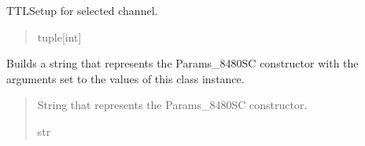 \documentclass[letterpaper,10pt,english]{sphinxmanual}
\begin{document}
\begin{fulllineitems}
\begin{fulllineitems}
\begin{quote}
\begin{description}
\end{description}\end{quote}

\end{fulllineitems}


\begin{fulllineitems}
\label{\detokenize{Morelia.Parameters:Morelia.Parameters.Params8480SC.Params8480SC.ttlSetup}}
\pysigstartsignatures
{}
\pysigstopsignatures
\sphinxAtStartPar
TTL\sphinxhyphen{}Setup for selected channel.
\begin{quote}\begin{description}
\sphinxAtStartPar
tuple{[}int{]}

\end{description}\end{quote}

\end{fulllineitems}


\begin{fulllineitems}
\label{\detokenize{Morelia.Parameters:Morelia.Parameters.Params8480SC.Params8480SC.GetInit}}
\pysigstartsignatures
{}
\pysigstopsignatures
\sphinxAtStartPar
Builds a string that represents the Params\_8480SC constructor with the         arguments set to the values of this class instance.
\begin{quote}\begin{description}
\sphinxAtStartPar
String that represents the Params\_8480SC constructor.

\sphinxAtStartPar
str

\end{description}\end{quote}

\end{fulllineitems}



\end{fulllineitems}
\end{document}
